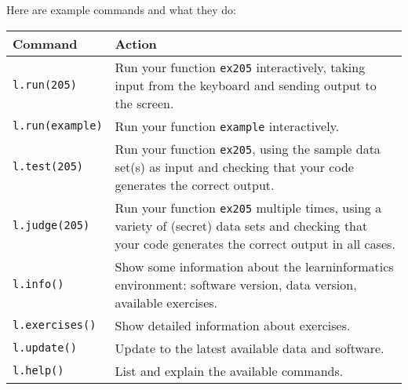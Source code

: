 Here are example commands and what they do:
\begin{center}
  \begin{tabular}{lp{10cm}}
    \toprule
    \textbf{Command}        & \textbf{Action} \\
    \midrule
    \texttt{l.run(205)}     & Run your function \texttt{ex205} interactively, taking
                              input from the keyboard and sending output to the
                              screen.\\[3pt]
    \texttt{l.run(example)} & Run your function \texttt{example} interactively.\\[3pt]
    \texttt{l.test(205)}    & Run your function \texttt{ex205}, using the sample data
                              set(s) as input and checking that your code generates
                              the correct output.\\[3pt]
    \texttt{l.judge(205)}   & Run your function \texttt{ex205} multiple times, using a
                              variety of (secret) data sets and checking that your code
                              generates the correct output in all cases.\\
    \midrule
    \texttt{l.info()}       & Show some information about the learninformatics
                              environment: software version, data version, available
                              exercises.\\
    \texttt{l.exercises()}  & Show detailed information about exercises.\\
    \texttt{l.update()}     & Update to the latest available data and software.\\
    \midrule
    \texttt{l.help()}       & List and explain the available commands.\\
    \bottomrule
  \end{tabular}
\end{center}
